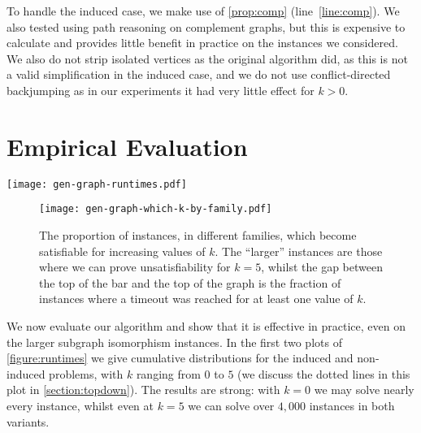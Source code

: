 \documentclass[letterpaper]{article}
\theoremstyle{definition}
\begin{document}
To handle the induced case, we make use of \cref{prop:comp} (line~\ref{line:comp}). We also tested
using path reasoning on complement graphs, but this is expensive to calculate and provides little
benefit in practice on the instances we considered.  We also do not strip isolated vertices as the
original algorithm did, as this is not a valid simplification in the induced case, and we do not use
conflict-directed backjumping as in our experiments it had very little effect for $k > 0$.

\section{Empirical Evaluation}\label{section:evaluation}

\begin{figure*}[tb]
    \centering
    \texttt{[image: gen-graph-runtimes.pdf]}
    \caption{In the first two plots we show the cumulative number of instances solved over time, for the
        induced and non-induced problems, with different values of $k$. We also show the results of
        iteratively increasing $k$ until a solution is found, and in the induced case, the
        performance of two leading maximum common subgraph algorithms. In the third plot we show results
        comparing iteratively increasing $k$ with our algorithm to other approaches on maximum
        common induced subgraph instances.}\label{figure:runtimes}
\end{figure*}

\begin{figure}[ht!] %
    \centering
    \texttt{[image: gen-graph-which-k-by-family.pdf]}
    \caption{The proportion of instances, in different families, which become satisfiable for
    increasing values of $k$. The ``larger'' instances are those where we can prove unsatisfiability for
    $k = 5$, whilst the gap between the top of the bar and the top of the graph is the fraction of
    instances where a timeout was reached for at least one value of $k$.}\label{figure:which-k}
\end{figure}

We now evaluate our algorithm and show that it is effective in practice, even on the larger subgraph
isomorphism instances. In the first two plots of \cref{figure:runtimes} we give cumulative
distributions for the induced and non-induced problems, with $k$ ranging from $0$ to $5$ (we discuss
the dotted lines in this plot in \cref{section:topdown}). The results are strong: with $k = 0$ we
may solve nearly every instance, whilst even at $k = 5$ we can solve over $4,000$ instances in both
variants.
\end{document}
